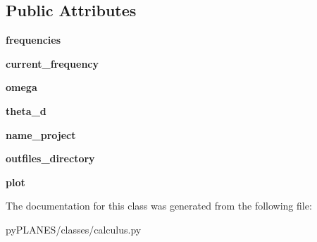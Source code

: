 \subsection*{Public Attributes}
\begin{DoxyCompactItemize}
\item 
\mbox{\label{classpy_p_l_a_n_e_s_1_1classes_1_1calculus_1_1_calculus_a46d44e93ffb105a61e167e1361651868}} 
{\bfseries frequencies}
\item 
\mbox{\label{classpy_p_l_a_n_e_s_1_1classes_1_1calculus_1_1_calculus_a624c4aab758cc5e70d2c06b7197236ae}} 
{\bfseries current\+\_\+frequency}
\item 
\mbox{\label{classpy_p_l_a_n_e_s_1_1classes_1_1calculus_1_1_calculus_a4a4a24e9d093f492c757a9f6ddd18e4e}} 
{\bfseries omega}
\item 
\mbox{\label{classpy_p_l_a_n_e_s_1_1classes_1_1calculus_1_1_calculus_ab2bf6be71b696b625e3fdfbdd6057e9e}} 
{\bfseries theta\+\_\+d}
\item 
\mbox{\label{classpy_p_l_a_n_e_s_1_1classes_1_1calculus_1_1_calculus_a90897b5f71d8a1781979c41d89a8ce4f}} 
{\bfseries name\+\_\+project}
\item 
\mbox{\label{classpy_p_l_a_n_e_s_1_1classes_1_1calculus_1_1_calculus_aeeef96d2c0922841fe1c6d9adcaf51cf}} 
{\bfseries outfiles\+\_\+directory}
\item 
\mbox{\label{classpy_p_l_a_n_e_s_1_1classes_1_1calculus_1_1_calculus_afcad641a836beff4dfdbeef6c7055b0f}} 
{\bfseries plot}
\end{DoxyCompactItemize}


The documentation for this class was generated from the following file\+:\begin{DoxyCompactItemize}
\item 
py\+P\+L\+A\+N\+E\+S/classes/calculus.\+py\end{DoxyCompactItemize}
